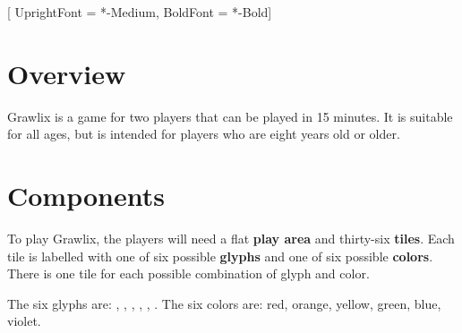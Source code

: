 \setmainfont{Quicksand}[
	UprightFont = *-Medium,
	BoldFont = *-Bold]
\raggedright

\section{Overview}
Grawlix is a game for two players that can be played in 15  minutes. It is suitable for all ages, but is intended for players who are eight years old or older.



\section{Components}
To play Grawlix, the players will need a flat \textbf{play area} and thirty-six \textbf{tiles}. Each tile is labelled with one of six possible \textbf{glyphs} and one of six possible \textbf{colors}.  There is one tile for each possible combination of glyph and color.

The six glyphs are: \smallat, \smallpound, \smalldollar, \smallpercent, \smallampersand, \smallasterisk. The six colors are: red, orange, yellow, green, blue, violet.

\begin{figure}[h]
\centering
{}

\end{figure}

